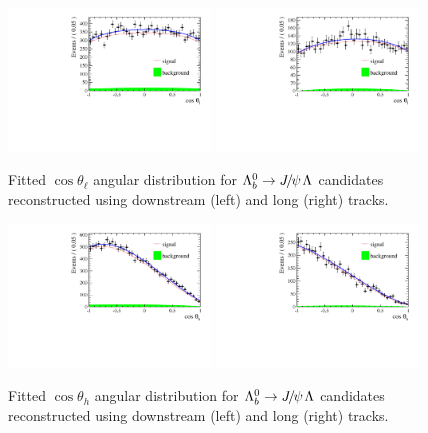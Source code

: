 \begin{figure}[h]
\centering
\includegraphics[width=0.48\textwidth]{Lmumu/figs/AngularDistribs/Fitted/Afb_DD_jpsi.pdf}
\includegraphics[width=0.48\textwidth]{Lmumu/figs/AngularDistribs/Fitted/Afb_LL_jpsi.pdf}
\caption{Fitted $\cos\theta_\ell$ angular distribution for $\Lb\to\jpsi\Lz$ candidates
reconstructed using downstream (left) and long (right) tracks. }
\label{fig:AngFitJpsi}
\end{figure}
%
\begin{figure}[h]
\centering
\includegraphics[width=0.48\textwidth]{Lmumu/figs/AngularDistribs/Fitted/AfbB_DD_jpsi.pdf}
\includegraphics[width=0.48\textwidth]{Lmumu/figs/AngularDistribs/Fitted/AfbB_LL_jpsi.pdf}
\caption{Fitted $\cos\theta_h$ angular distribution for $\Lb\to\jpsi\Lz$ candidates
reconstructed using downstream (left) and long (right) tracks.  }
\label{fig:AngFitBJpsi}
\end{figure}
